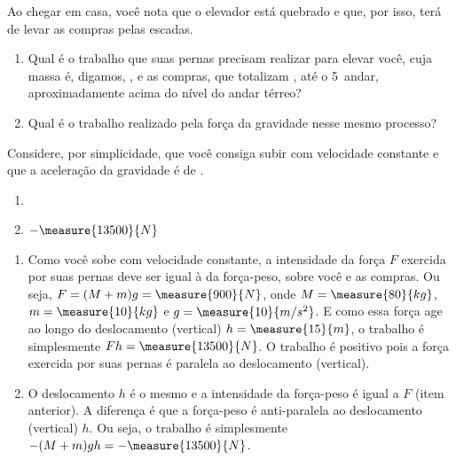 \begin{question}
	Ao chegar em casa, você nota que o elevador está quebrado e que, por isso, terá de levar as compras pelas escadas.
	\begin{enumerate}
		\item Qual é o trabalho que suas pernas precisam realizar para elevar você, cuja massa é, digamos, , e as compras, que totalizam , até o 5\textordmasculine\ andar, aproximadamente  acima do nível do andar térreo?
		\item Qual é o trabalho realizado pela força da gravidade nesse mesmo processo?
	\end{enumerate}

	Considere, por simplicidade, que você consiga subir com velocidade constante e que a aceleração da gravidade é de .

	\begin{answer}
		\begin{enumerate}
			\item {}
			\item $-\measure{13500}{N}$
		\end{enumerate}
	\end{answer}

	\begin{solution}
		\begin{enumerate}
			\item Como você sobe com velocidade constante, a intensidade da força $F$ exercida por suas pernas deve ser igual à da força-peso, sobre você e as compras.
			Ou seja, $F = (M + m)g = \measure{900}{N}$, onde $M = \measure{80}{kg}$, $m = \measure{10}{kg}$ e $g = \measure{10}{m/s^2}$.
			E como essa força age ao longo do deslocamento (vertical) $h = \measure{15}{m}$, o trabalho é simplesmente $Fh = \measure{13500}{N}$.
			O trabalho é positivo pois a força exercida por suas pernas é paralela ao deslocamento (vertical).

			\item O deslocamento $h$ é o mesmo e a intensidade da força-peso é igual a $F$ (item anterior).
			A diferença é que a força-peso é anti-paralela ao deslocamento (vertical) $h$.
			Ou seja, o trabalho é simplesmente $-(M + m)gh = -\measure{13500}{N}$.
		\end{enumerate}
	\end{solution}
\end{question}